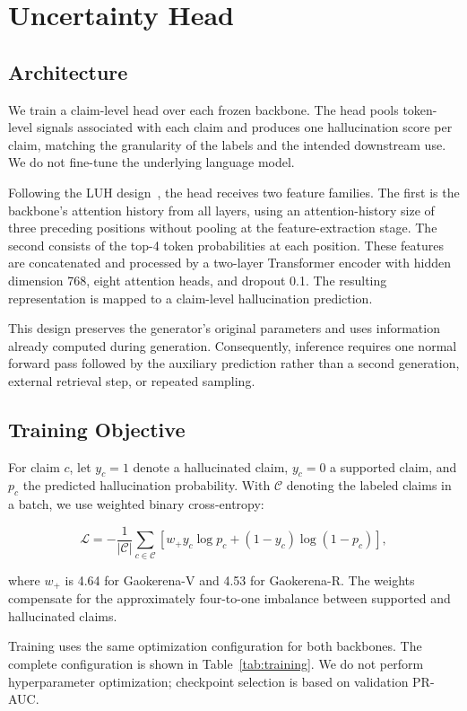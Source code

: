 \documentclass[conference]{IEEEtran}
\begin{document}
\section{Uncertainty Head}

\subsection{Architecture}

We train a claim-level head over each frozen backbone. The head pools token-level signals associated with each claim and produces one hallucination score per claim, matching the granularity of the labels and the intended downstream use. We do not fine-tune the underlying language model.

Following the LUH design~\cite{b1}, the head receives two feature families. The first is the backbone's attention history from all layers, using an attention-history size of three preceding positions without pooling at the feature-extraction stage. The second consists of the top-4 token probabilities at each position. These features are concatenated and processed by a two-layer Transformer encoder with hidden dimension 768, eight attention heads, and dropout 0.1. The resulting representation is mapped to a claim-level hallucination prediction.

This design preserves the generator's original parameters and uses information already computed during generation. Consequently, inference requires one normal forward pass followed by the auxiliary prediction rather than a second generation, external retrieval step, or repeated sampling.

\subsection{Training Objective}

For claim $c$, let $y_c=1$ denote a hallucinated claim, $y_c=0$ a supported claim, and $p_c$ the predicted hallucination probability. With $\mathcal{C}$ denoting the labeled claims in a batch, we use weighted binary cross-entropy:

\[
\mathcal{L} =
-\frac{1}{|\mathcal{C}|}
\sum_{c\in\mathcal{C}}
\left[
 w_{+} y_c \log p_c + (1-y_c)\log(1-p_c)
\right],
\]

where $w_{+}$ is 4.64 for Gaokerena-V and 4.53 for Gaokerena-R. The weights compensate for the approximately four-to-one imbalance between supported and hallucinated claims.

Training uses the same optimization configuration for both backbones. The complete configuration is shown in Table~\ref{tab:training}. We do not perform hyperparameter optimization; checkpoint selection is based on validation PR-AUC.
\end{document}
